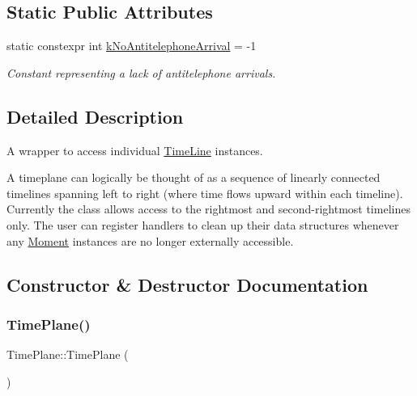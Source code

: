 \subsection*{Static Public Attributes}
\begin{DoxyCompactItemize}
\item 
\mbox{\label{classtimeplane_1_1_time_plane_ab131bfc5a6c85a3db846591159db2559}} 
static constexpr int \hyperlink{classtimeplane_1_1_time_plane_ab131bfc5a6c85a3db846591159db2559}{k\+No\+Antitelephone\+Arrival} = -\/1
\begin{DoxyCompactList}\small\item\em Constant representing a lack of antitelephone arrivals. \end{DoxyCompactList}\end{DoxyCompactItemize}


\subsection{Detailed Description}
A wrapper to access individual {\ttfamily \hyperlink{classtimeplane_1_1_time_line}{Time\+Line}} instances. 

A timeplane can logically be thought of as a sequence of linearly connected timelines spanning left to right (where time flows upward within each timeline). Currently the class allows access to the rightmost and second-\/rightmost timelines only. The user can register handlers to clean up their data structures whenever any {\ttfamily \hyperlink{classtimeplane_1_1_moment}{Moment}} instances are no longer externally accessible. 

\subsection{Constructor \& Destructor Documentation}
\mbox{\label{classtimeplane_1_1_time_plane_a8d8f1227ade6490fa8b814f1b7f18ecc}} 
\subsubsection{\texorpdfstring{Time\+Plane()}{TimePlane()}}
{\footnotesize\ttfamily Time\+Plane\+::\+Time\+Plane (\begin{DoxyParamCaption}{ }\end{DoxyParamCaption})}



